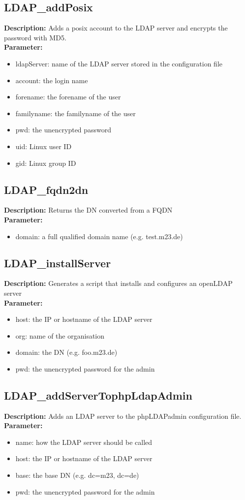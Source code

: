 \subsection{LDAP\_addPosix}
\textbf{Description:} Adds a posix account to the LDAP server and encrypts the password with MD5.\\
\textbf{Parameter:}
\begin{itemize}
\item ldapServer: name of the LDAP server stored in the configuration file
\item account: the login name
\item forename: the forename of the user
\item familyname: the familyname of the user
\item pwd: the unencrypted password
\item uid: Linux user ID
\item gid: Linux group ID
\end{itemize}

\subsection{LDAP\_fqdn2dn}
\textbf{Description:} Returns the DN converted from a FQDN\\
\textbf{Parameter:}
\begin{itemize}
\item domain: a full qualified domain name (e.g. test.m23.de)
\end{itemize}

\subsection{LDAP\_installServer}
\textbf{Description:} Generates a script that installs and configures an openLDAP server\\
\textbf{Parameter:}
\begin{itemize}
\item host: the IP or hostname of the LDAP server
\item org: name of the organisation
\item domain: the DN (e.g. foo.m23.de)
\item pwd: the unencrypted password for the admin
\end{itemize}

\subsection{LDAP\_addServerTophpLdapAdmin}
\textbf{Description:} Adds an LDAP server to the phpLDAPadmin configuration file.\\
\textbf{Parameter:}
\begin{itemize}
\item name: how the LDAP server should be called
\item host: the IP or hostname of the LDAP server
\item base: the base DN (e.g. dc=m23, dc=de)
\item pwd: the unencrypted password for the admin
\end{itemize}

